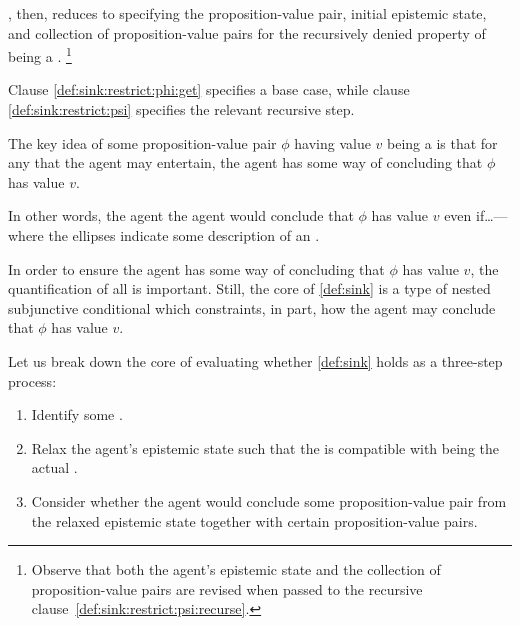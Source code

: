 \begin{note}
  \ideaCSA{}, then, reduces to specifying the proposition-value pair, initial epistemic state, and collection of proposition-value pairs for the recursively denied property of being a \sink{}.\nolinebreak
  \footnote{
    Observe that both the agent's epistemic state and the collection of proposition-value pairs are revised when passed to the recursive clause~\ref{def:sink:restrict:psi:recurse}.
  }

  Clause \ref{def:sink:restrict:phi:get} specifies a base case, while clause \ref{def:sink:restrict:psi} specifies the relevant recursive step.
\end{note}

\begin{note}
  The key idea of some proposition-value pair \(\phi\) having value \(v\) being a \sink{} is that for any \epPAd{} \world{} that the agent may entertain, the agent has some way of concluding that \(\phi\) has value \(v\).

  In other words, the agent the agent would conclude that \(\phi\) has value \(v\) even if\dots\space --- where the ellipses indicate some description of an \epPAd{} \world{}.
\end{note}

\begin{note}
  In order to ensure the agent has some way of concluding that \(\phi\) has value \(v\), the quantification of all \epPAd{}  is important.
  Still, the core of \autoref{def:sink} is a type of nested subjunctive conditional which constraints, in part, how the agent may conclude that \(\phi\) has value \(v\).

  Let us break down the core of evaluating whether \autoref{def:sink} holds as a three-step process:
  \begin{enumerate}[label=\Alph*., ref=\Alph*]
  \item
    \label{ideaCSA:sink:step:A}
    Identify some \epPAd{} \world{}.
  \item
    \label{ideaCSA:sink:step:B}
    Relax the agent's epistemic state such that the \epPAd{} \world{} is compatible with being the actual \world{}.
  \item
    \label{ideaCSA:sink:step:C}
    Consider whether the agent would conclude some proposition-value pair from the relaxed epistemic state together with certain proposition-value pairs.
  \end{enumerate}
\end{note}

